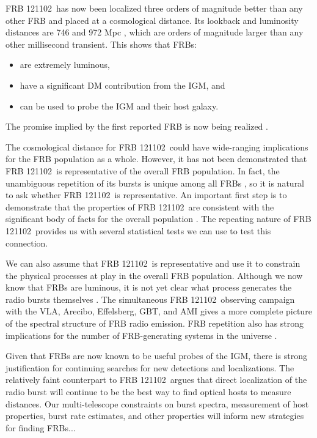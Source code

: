 \documentclass{emulateapj}
\newcommand{\frb}{FRB 121102}
\begin{document}
\frb\ has now been localized three orders of magnitude better than any other FRB and placed at a cosmological distance. Its lookback and luminosity distances are 746 and 972 Mpc \citep{planck15}, which are orders of magnitude larger than any other millisecond transient. This shows that FRBs:
\begin{itemize}
 \item are extremely luminous, 
 \item have a significant DM contribution from the IGM, and
 \item can be used to probe the IGM and their host galaxy.
\end{itemize}
The promise implied by the first reported FRB is now being realized \citep{2007Sci...318..777L}.

The cosmological distance for \frb\ could have wide-ranging implications for the FRB population as a whole. However, it has not been demonstrated that \frb\ is representative of the overall FRB population. In fact, the unambiguous repetition of its bursts is unique among all FRBs \citep{2015MNRAS.454..457P}, so it is natural to ask whether \frb\ is representative. An important first step is to demonstrate that the properties of \frb\ are consistent with the significant body of facts for the overall population \citep{2015MNRAS.451.3278M, 2016MPLA...3130013K}. The repeating nature of \frb\ provides us with several statistical tests we can use to test this connection.

We can also assume that \frb\ is representative and use it to constrain the physical processes at play in the overall FRB population. Although we now know that FRBs are luminous, it is not yet clear what process generates the radio bursts themselves \citep{2014PhRvD..89j3009K, 2014ApJ...785L..26L, 2016MNRAS.457..232C}. The simultaneous \frb\ observing campaign with the VLA, Arecibo, Effelsberg, GBT, and AMI gives a more complete picture of the spectral structure of FRB radio emission. FRB repetition also has strong implications for the number of FRB-generating systems in the universe \citep{2016MNRAS.458L..89C}.

Given that FRBs are now known to be useful probes of the IGM, there is strong justification for continuing searches for new detections and localizations. The relatively faint counterpart to \frb\ argues that direct localization of the radio burst will continue to be the best way to find optical hosts to measure distances. Our multi-telescope constraints on burst spectra, measurement of host properties, burst rate estimates, and other properties will inform new strategies for finding FRBs...
\end{document}
